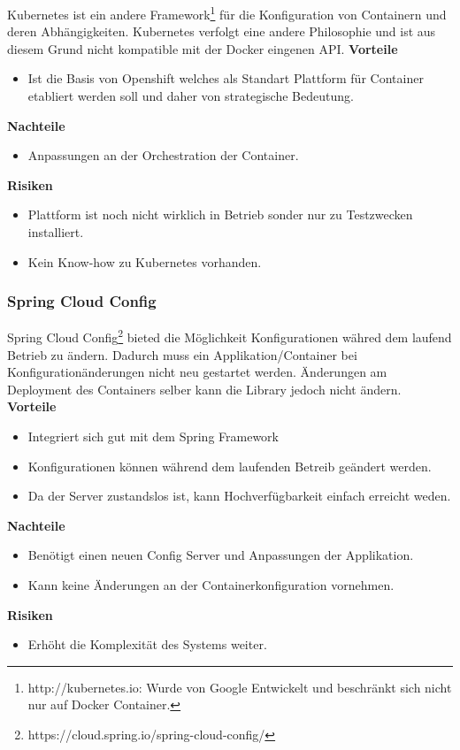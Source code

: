 Kubernetes ist ein andere Framework\footnote{http://kubernetes.io: Wurde von Google Entwickelt und beschränkt sich nicht nur auf Docker Container.} für die Konfiguration von Containern und deren Abhängigkeiten. Kubernetes verfolgt eine andere Philosophie und ist aus diesem Grund nicht kompatible mit der Docker eingenen API.
\newline
\newline
\textbf{Vorteile}
\begin{itemize}
	\item Ist die Basis von Openshift welches als Standart Plattform für Container etabliert werden soll und daher von strategische Bedeutung.
\end{itemize}
\textbf{Nachteile}
\begin{itemize}
	\item Anpassungen an der Orchestration der Container.
\end{itemize}
\textbf{Risiken}
\begin{itemize}
	\item Plattform ist noch nicht wirklich in Betrieb sonder nur zu Testzwecken installiert.
	\item Kein Know-how zu Kubernetes vorhanden.
\end{itemize}

\subsubsection{Spring Cloud Config}

Spring Cloud Config\footnote{https://cloud.spring.io/spring-cloud-config/} bieted die Möglichkeit Konfigurationen währed dem laufend Betrieb zu ändern. Dadurch muss ein Applikation/Container bei Konfigurationänderungen nicht neu gestartet werden. Änderungen am Deployment des Containers selber kann die Library jedoch nicht ändern.\newline
\newline
\textbf{Vorteile}
\begin{itemize}
	\item Integriert sich gut mit dem Spring Framework
	\item Konfigurationen können während dem laufenden Betreib geändert werden.
	\item Da der Server zustandslos ist, kann Hochverfügbarkeit einfach erreicht weden.
\end{itemize}
\textbf{Nachteile}
\begin{itemize}
	\item Benötigt einen neuen Config Server und Anpassungen der Applikation.
	\item Kann keine Änderungen an der Containerkonfiguration vornehmen.
\end{itemize}
\textbf{Risiken}
\begin{itemize}
	\item Erhöht die Komplexität des Systems weiter.
\end{itemize}

